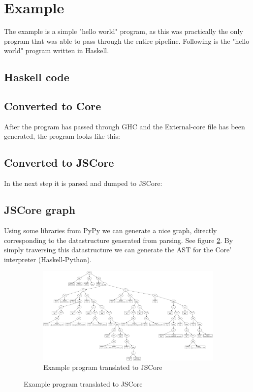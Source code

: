 
\section{Example}

The example is a simple "hello world" program, as this was practically
the only program that was able to pass through the entire pipeline. Following
is the "hello world" program written in Haskell.

\subsection{Haskell code}



\subsection{Converted to Core}

After the program has passed through GHC and the External-core file
has been generated, the program looks like this:



\subsection{Converted to JSCore}

In the next step it is parsed and dumped to JSCore:



\subsection{JSCore graph}

Using some libraries from PyPy we can generate a nice graph,
directly corresponding to the datastructure generated from parsing. 
See figure \ref{helloworldgraph}.
By simply traversing this datastructure we can generate the AST for the Core' 
interpreter (Haskell-Python).

\begin{figure}
\begin{figure}[H]
\includegraphics[width=\textwidth]{../interpreter/tests/helloworld/helloworld.png}
\caption{Example program translated to JSCore}
\label{helloworldgraph}
\end{figure}
\end{figure}

